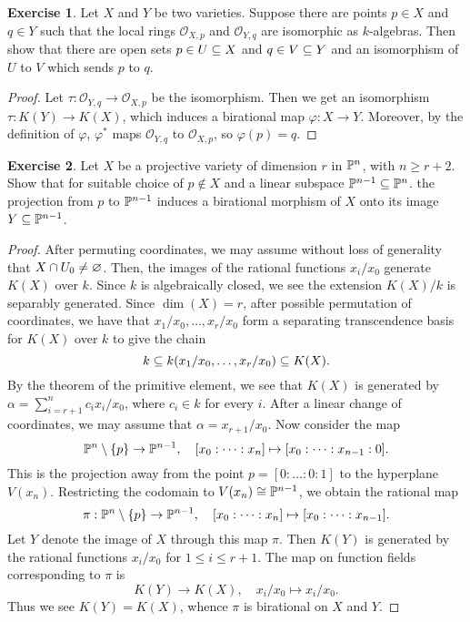 \documentclass[11pt]{book}
\theoremstyle{definition}
\newtheorem{exercise}{Exercise}[section]
\begin{document}
\begin{exercise}
Let $X$ and $Y$ be two varieties. Suppose there are points $p\in X$ and $q\in Y$ such that the local rings $\mathcal{O}_{X,p}$ and $\mathcal{O}_{Y,q}$ are isomorphic as $k$-algebras. Then show that there are open sets $p\in U\sub X$ and $q\in V\sub Y$ and an isomorphism of $U$ to $V$ which sends $p$ to $q$.
\end{exercise}
\begin{proof}
Let $\tau:\mathcal{O}_{Y,q}\to\mathcal{O}_{X,p}$ be the isomorphism. Then we get an isomorphism $\tau:K(Y)\to K(X)$, which induces a birational map $\varphi:X\to Y$. Moreover, by the definition of $\varphi$, $\varphi^*$ maps $\mathcal{O}_{Y,q}$ to $\mathcal{O}_{X,p}$, so $\varphi(p)=q$.
\end{proof}
\begin{exercise}
Let $X$ be a projective variety of dimension $r$ in $\P^n$, with $n\geq r+2$. Show that for suitable choice of $p\notin X$ and a linear subspace $\P^{n-1}\sub\P^n$. the projection from $p$ to $\P^{n-1}$ induces a birational morphism of $X$ onto its image $Y\sub\P^{n-1}$. 
\end{exercise}
\begin{proof}
After permuting coordinates, we may assume without loss of generality that $X\cap U_0\neq\emp$. Then, the images of the rational functions $x_i/x_0$ generate $K(X)$ over $k$. Since $k$ is algebraically closed, we see the extension $K(X)/k$ is separably generated. Since $\dim(X)=r$, after possible permutation of coordinates, we have that $x_1/x_0,\dots,x_r/x_0$ form a separating transcendence basis for $K(X)$ over $k$ to give the chain
\[k\sub k(x_1/x_0,\dots,x_r/x_0)\sub K(X).\]
By the theorem of the primitive element, we see that $K(X)$ is generated by $\alpha=\sum_{i=r+1}^{n}c_ix_i/x_0$, where $c_i\in k$ for every $i$. After a linear change of coordinates, we may assume that $\alpha=x_{r+1}/x_0$. Now consider the map
\[\P^n\setminus\{p\}\to\P^{n-1},\quad [x_0:\dots:x_n]\mapsto[x_0:\dots:x_{n-1}:0].\]
This is the projection away from the point $p=[0:\dots:0:1]$ to the hyperplane $V(x_n)$. Restricting the codomain to $V(x_n)\cong\P^{n-1}$, we obtain the rational map
\[\pi:\P^n\setminus\{p\}\to\P^{n-1},\quad [x_0:\dots:x_n]\mapsto[x_0:\dots:x_{n-1}].\]
Let $Y$ denote the image of $X$ through this map $\pi$. Then $K(Y)$ is generated by the rational functions $x_i/x_0$ for $1\leq i\leq r+1$. The map on function fields corresponding to $\pi$ is
\[K(Y)\to K(X),\quad x_i/x_0\mapsto x_i/x_0.\]
Thus we see $K(Y)=K(X)$, whence $\pi$ is birational on $X$ and $Y$.
\end{proof}
\end{document}
